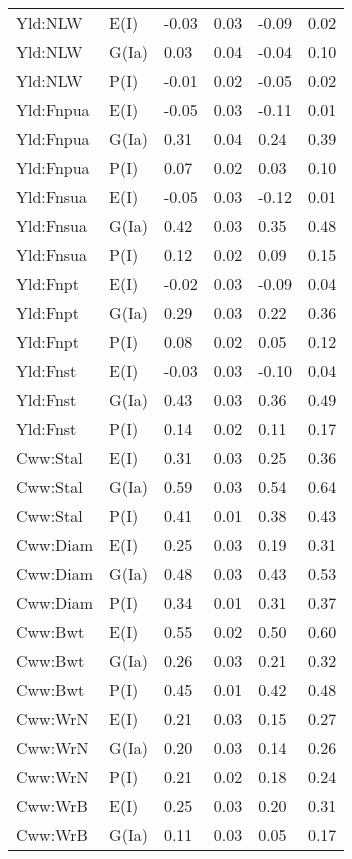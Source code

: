 \begin{center}
\begin{longtable}{|p{1.1in}|p{0.7in}|p{0.7in}|p{0.6in}|p{0.6in}|p{0.6in}|}
  Yld:NLW & E(I) & -0.03 & 0.03 & -0.09 & 0.02 \\ 
  Yld:NLW & G(Ia) & 0.03 & 0.04 & -0.04 & 0.10 \\ 
  Yld:NLW & P(I) & -0.01 & 0.02 & -0.05 & 0.02 \\ 
  Yld:Fnpua & E(I) & -0.05 & 0.03 & -0.11 & 0.01 \\ 
  Yld:Fnpua & G(Ia) & 0.31 & 0.04 & 0.24 & 0.39 \\ 
  Yld:Fnpua & P(I) & 0.07 & 0.02 & 0.03 & 0.10 \\ 
  Yld:Fnsua & E(I) & -0.05 & 0.03 & -0.12 & 0.01 \\ 
  Yld:Fnsua & G(Ia) & 0.42 & 0.03 & 0.35 & 0.48 \\ 
  Yld:Fnsua & P(I) & 0.12 & 0.02 & 0.09 & 0.15 \\ 
  Yld:Fnpt & E(I) & -0.02 & 0.03 & -0.09 & 0.04 \\ 
  Yld:Fnpt & G(Ia) & 0.29 & 0.03 & 0.22 & 0.36 \\ 
  Yld:Fnpt & P(I) & 0.08 & 0.02 & 0.05 & 0.12 \\ 
  Yld:Fnst & E(I) & -0.03 & 0.03 & -0.10 & 0.04 \\ 
  Yld:Fnst & G(Ia) & 0.43 & 0.03 & 0.36 & 0.49 \\ 
  Yld:Fnst & P(I) & 0.14 & 0.02 & 0.11 & 0.17 \\ 
  Cww:Stal & E(I) & 0.31 & 0.03 & 0.25 & 0.36 \\ 
  Cww:Stal & G(Ia) & 0.59 & 0.03 & 0.54 & 0.64 \\ 
  Cww:Stal & P(I) & 0.41 & 0.01 & 0.38 & 0.43 \\ 
  Cww:Diam & E(I) & 0.25 & 0.03 & 0.19 & 0.31 \\ 
  Cww:Diam & G(Ia) & 0.48 & 0.03 & 0.43 & 0.53 \\ 
  Cww:Diam & P(I) & 0.34 & 0.01 & 0.31 & 0.37 \\ 
  Cww:Bwt & E(I) & 0.55 & 0.02 & 0.50 & 0.60 \\ 
  Cww:Bwt & G(Ia) & 0.26 & 0.03 & 0.21 & 0.32 \\ 
  Cww:Bwt & P(I) & 0.45 & 0.01 & 0.42 & 0.48 \\ 
  Cww:WrN & E(I) & 0.21 & 0.03 & 0.15 & 0.27 \\ 
  Cww:WrN & G(Ia) & 0.20 & 0.03 & 0.14 & 0.26 \\ 
  Cww:WrN & P(I) & 0.21 & 0.02 & 0.18 & 0.24 \\ 
  Cww:WrB & E(I) & 0.25 & 0.03 & 0.20 & 0.31 \\ 
  Cww:WrB & G(Ia) & 0.11 & 0.03 & 0.05 & 0.17 \\ 

\end{longtable}
\end{center}
